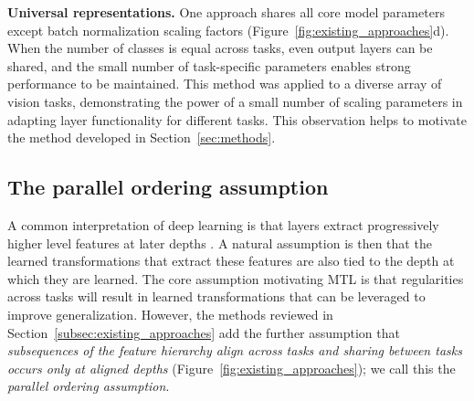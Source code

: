 \documentclass{article}
\theoremstyle{definition}
\theoremstyle{remark}
\begin{document}
\textbf{Universal representations.}
One approach shares all core model parameters except batch normalization scaling factors \citep{Bilen:2017} (Figure~\ref{fig:existing_approaches}d).
When the number of classes is equal across tasks, even output layers can be shared, and the small number of task-specific parameters enables strong performance to be maintained.
This method was applied to a diverse array of vision tasks, demonstrating the power of a small number of scaling parameters in adapting layer functionality for different tasks. This observation helps to motivate the method developed in Section~\ref{sec:methods}.


\subsection{The parallel ordering assumption} \label{subsec:fhs}

A common interpretation of deep learning is that layers extract progressively higher level features at later depths \citep{Lecun:2015}.
A natural assumption is then that the learned transformations that extract these features are also tied to the depth at which they are learned.
The core assumption motivating MTL is that regularities across tasks will result in learned transformations that can be leveraged to improve generalization.
However, the methods reviewed in Section~\ref{subsec:existing_approaches} add the further assumption that \emph{subsequences of the feature hierarchy align across tasks and sharing between tasks occurs only at aligned depths} (Figure~\ref{fig:existing_approaches}); we call this the \emph{parallel ordering assumption}.
\end{document}
